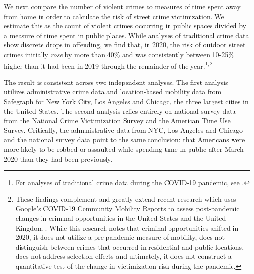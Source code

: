 \documentclass[12pt]{article}
\begin{document}

We next compare the number of violent crimes to measures of time spent away from home in order to calculate the risk of street crime victimization. We estimate this as the count of violent crimes occurring in public spaces divided by a measure of time spent in public places. While analyses of traditional crime data show discrete drops in offending, we find that, in 2020, the risk of outdoor street crimes initially \emph{rose} by more than 40\% and was consistently between 10-25\% higher than it had been in 2019 through the remainder of the year.\footnote{For analyses of traditional crime data during the COVID-19 pandemic, see \citet{ashby2020initial, boman2020has, gerell2020minor, hodgkinson2020show, langton2021six, payne2020covid, piquero2020staying, shayegh2020staying, abrams2021covid, boman2021global, campedelli2021exploring, de2021druglords, nivette2021global}.}$^{,}$\footnote{These findings complement and greatly extend recent research which uses Google's COVID-19 Community Mobility Reports to assess post-pandemic changes in criminal opportunities in the United States \citep{lopez2021crime} and the United Kingdom \citep{halford2020crime}. While this research notes that criminal opportunities shifted in 2020, it does not utilize a pre-pandemic measure of mobility, does not distinguish between crimes that occurred in residential and public locations, does not address selection effects and ultimately, it does not construct a quantitative test of the change in victimization risk during the pandemic.}

The result is consistent across two independent analyses. The first analysis utilizes administrative crime data and location-based mobility data from Safegraph for New York City, Los Angeles and Chicago, the three largest cities in the United States. The second analysis relies entirely on national survey data from the National Crime Victimization Survey and the American Time Use Survey. Critically, the administrative data from NYC, Los Angeles and Chicago and the national survey data point to the same conclusion: that Americans were more likely to be robbed or assaulted while spending time in public after March 2020 than they had been previously. 
\end{document}
